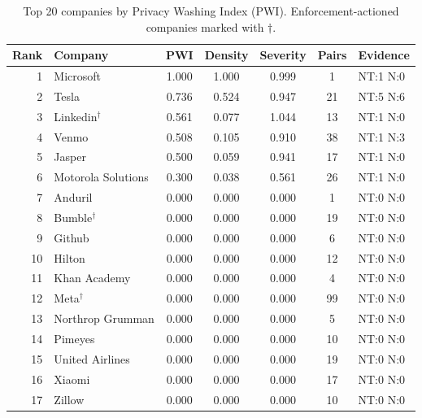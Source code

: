 \begin{table}[t]
\centering
\caption{Top 20 companies by Privacy Washing Index (PWI). Enforcement-actioned companies marked with $\dagger$.}
\label{tab:top20}
\begin{tabular}{rlccccl}
\toprule
Rank & Company & PWI & Density & Severity & Pairs & Evidence \\
\midrule
1 & Microsoft & 1.000 & 1.000 & 0.999 & 1 & NT:1 N:0 \\
2 & Tesla & 0.736 & 0.524 & 0.947 & 21 & NT:5 N:6 \\
3 & Linkedin$^\dagger$ & 0.561 & 0.077 & 1.044 & 13 & NT:1 N:0 \\
4 & Venmo & 0.508 & 0.105 & 0.910 & 38 & NT:1 N:3 \\
5 & Jasper & 0.500 & 0.059 & 0.941 & 17 & NT:1 N:0 \\
6 & Motorola Solutions & 0.300 & 0.038 & 0.561 & 26 & NT:1 N:0 \\
7 & Anduril & 0.000 & 0.000 & 0.000 & 1 & NT:0 N:0 \\
8 & Bumble$^\dagger$ & 0.000 & 0.000 & 0.000 & 19 & NT:0 N:0 \\
9 & Github & 0.000 & 0.000 & 0.000 & 6 & NT:0 N:0 \\
10 & Hilton & 0.000 & 0.000 & 0.000 & 12 & NT:0 N:0 \\
11 & Khan Academy & 0.000 & 0.000 & 0.000 & 4 & NT:0 N:0 \\
12 & Meta$^\dagger$ & 0.000 & 0.000 & 0.000 & 99 & NT:0 N:0 \\
13 & Northrop Grumman & 0.000 & 0.000 & 0.000 & 5 & NT:0 N:0 \\
14 & Pimeyes & 0.000 & 0.000 & 0.000 & 10 & NT:0 N:0 \\
15 & United Airlines & 0.000 & 0.000 & 0.000 & 19 & NT:0 N:0 \\
16 & Xiaomi & 0.000 & 0.000 & 0.000 & 17 & NT:0 N:0 \\
17 & Zillow & 0.000 & 0.000 & 0.000 & 10 & NT:0 N:0 \\
\bottomrule
\end{tabular}
\end{table}

